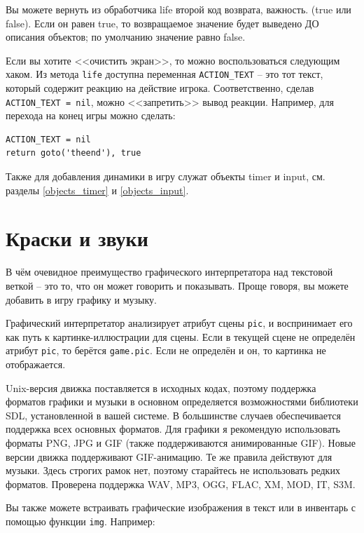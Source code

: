 \documentclass[12pt]{article}
\begin{document}
Вы можете вернуть из обработчика life второй код возврата, важность. (true или false). Если он равен true, то возвращаемое значение будет выведено ДО описания объектов; по умолчанию значение равно false.

Если вы хотите <<очистить экран>>, то можно воспользоваться следующим хаком. Из метода \verb/life/ доступна переменная \verb/ACTION_TEXT/ -- это тот текст, который содержит реакцию на действие игрока. Соответственно, сделав \verb/ACTION_TEXT = nil/, можно <<запретить>> вывод реакции. Например, для перехода на конец игры можно сделать:

\begin{verbatim}
ACTION_TEXT = nil
return goto('theend'), true
\end{verbatim}

Также для добавления динамики в игру служат объекты timer и input, см. разделы \ref{objects_timer} и \ref{objects_input}.

\section{Краски и звуки}

В чём очевидное преимущество графического интерпретатора над текстовой веткой -- это то, что он может говорить и показывать. Проще говоря, вы можете добавить в игру графику и музыку.

Графический интерпретатор анализирует атрибут сцены \verb/pic/, и воспринимает его как путь к картинке-ил\-лю\-страции для сцены. Если в текущей сцене не определён атрибут \verb/pic/, то берётся \verb/game.pic/. Если не определён и он, то картинка не отображается.

Unix-версия движка поставляется в исходных кодах, поэтому поддержка форматов графики и музыки в основном определяется возможностями библиотеки SDL, установленной в вашей системе. В большинстве случаев обеспечивается поддержка всех основных форматов. Для графики я рекомендую использовать форматы PNG, JPG и GIF (также поддерживаются анимированные GIF). Новые версии движка поддерживают GIF-анимацию. Те же правила действуют для музыки. Здесь строгих рамок нет, поэтому старайтесь не использовать редких форматов. Проверена поддержка WAV, MP3, OGG, FLAC, XM, MOD, IT, S3M.

Вы также можете встраивать графические изображения в текст или в инвентарь с помощью функции \verb/img/. Например:
\end{document}
